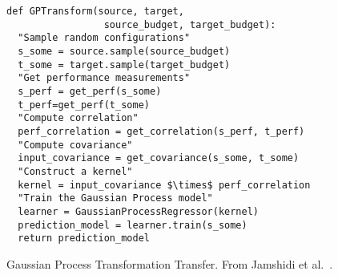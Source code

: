 \begin{figure}[t]
\small
\begin{lstlisting}[xrightmargin=6ex, mathescape,frame=none,numbers=right]
def GPTransform(source, target, 
                 source_budget, target_budget): 
  "Sample random configurations"
  s_some = source.sample(source_budget)
  t_some = target.sample(target_budget)
  "Get performance measurements"
  s_perf = get_perf(s_some)
  t_perf=get_perf(t_some)
  "Compute correlation"
  perf_correlation = get_correlation(s_perf, t_perf)
  "Compute covariance"
  input_covariance = get_covariance(s_some, t_some)
  "Construct a kernel"
  kernel = input_covariance $\times$ perf_correlation
  "Train the Gaussian Process model"
  learner = GaussianProcessRegressor(kernel)
  prediction_model = learner.train(s_some)
  return prediction_model
\end{lstlisting}
\caption{\small{Gaussian Process Transformation Transfer. From   Jamshidi et al.~\cite{jamshidi2017transfer}.}}
\label{fig:gptransform}  
\end{figure}

